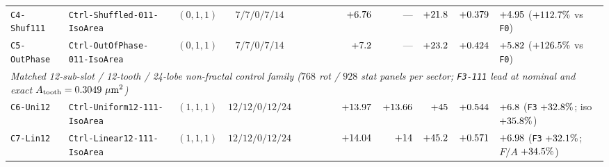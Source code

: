 \begin{table}[!htbp]
{\begin{tabular}{llccrrrrrrrrl}
\texttt{C4-Shuf111} & \texttt{Ctrl-Shuffled-011-IsoArea} & $(0,1,1)$ & $7 / 7 / 0 / 7 / 14$ & \roundfour{\NthreeUnithreedCtrlShuffledoneoneoneAreaUmtwo} & \roundtwo{\NthreeUnithreedCtrlShuffledoneoneonePedgeUm} & \roundtwo{\NthreeUnithreedCtrlShuffledoneoneoneAswUmtwo} & \roundone{\NthreeUnithreedCtrlShuffledoneoneoneGrHarmNm} & $+\roundtwo{\NthreeUnithreedCtrlShuffledoneoneoneFzPn}$ & --- & $+\roundone{\NthreeUnithreedCtrlShuffledoneoneoneFa}$ & $+\roundthree{\NthreeUnithreedCtrlShuffledoneoneoneFp}$ & $+\roundtwo{\NthreeUnithreedCtrlShuffledoneoneoneFasw}$ ($+\fpeval{round(100*(\NthreeUnithreedCtrlShuffledoneoneoneFzPn-\NthreeUnithreedFzerozerozeroFzPn)/\NthreeUnithreedFzerozerozeroFzPn,1)}\%$ vs \texttt{F0}) \\
\texttt{C5-OutPhase} & \texttt{Ctrl-OutOfPhase-011-IsoArea} & $(0,1,1)$ & $7 / 7 / 0 / 7 / 14$ & \roundfour{\NthreeUnithreedCtrlOutphaseAreaUmtwo} & \roundtwo{\NthreeUnithreedCtrlOutphasePedgeUm} & \roundtwo{\NthreeUnithreedCtrlOutphaseAswUmtwo} & \roundone{\NthreeUnithreedCtrlOutphaseGrHarmNm} & $+\roundtwo{\NthreeUnithreedCtrlOutphaseFzPn}$ & --- & $+\roundone{\NthreeUnithreedCtrlOutphaseFa}$ & $+\roundthree{\NthreeUnithreedCtrlOutphaseFp}$ & $+\roundtwo{\NthreeUnithreedCtrlOutphaseFasw}$ ($+\fpeval{round(100*(\NthreeUnithreedCtrlOutphaseFzPn-\NthreeUnithreedFzerozerozeroFzPn)/\NthreeUnithreedFzerozerozeroFzPn,1)}\%$ vs \texttt{F0}) \\
\midrule
\multicolumn{13}{l}{\emph{Matched 12-sub-slot / 12-tooth / 24-lobe non-fractal control family ($768$ rot / $928$ stat panels per sector; \texttt{F3-111} lead at nominal and exact $A_{\rm tooth}=0.3049\ \mu\text{m}^2$)}} \\
\texttt{C6-Uni12} & \texttt{Ctrl-Uniform12-111-IsoArea} & $(1,1,1)$ & $12 / 12 / 0 / 12 / 24$ & \roundfour{\NthreeUnithreedCtrlUnionetwoAreaUmtwo} & \roundtwo{\NthreeUnithreedCtrlUnionetwoPedgeUm} & \roundtwo{\NthreeUnithreedCtrlUnionetwoAswUmtwo} & \roundone{\NthreeUnithreedCtrlUnionetwoGrHarmNm} & $+\roundtwo{\NthreeUnithreedCtrlUnionetwoFzPn}$ & $+\roundtwo{\NthreeIsothreezerofournineCtrlUnionetwoFzPn}$ & $+\roundone{\NthreeUnithreedCtrlUnionetwoFa}$ & $+\roundthree{\NthreeUnithreedCtrlUnionetwoFp}$ & $+\roundtwo{\NthreeUnithreedCtrlUnionetwoFasw}$ (\texttt{F3} $+\roundone{\NthreeUnithreedGainFoneoneoneVsUnionetwoPct}\%$; iso $+\roundone{\NthreeIsothreezerofournineGainFoneoneoneVsUnionetwoPct}\%$) \\
\texttt{C7-Lin12} & \texttt{Ctrl-Linear12-111-IsoArea} & $(1,1,1)$ & $12 / 12 / 0 / 12 / 24$ & \roundfour{\NthreeUnithreedCtrlLinonetwoAreaUmtwo} & \roundtwo{\NthreeUnithreedCtrlLinonetwoPedgeUm} & \roundtwo{\NthreeUnithreedCtrlLinonetwoAswUmtwo} & \roundone{\NthreeUnithreedCtrlLinonetwoGrHarmNm} & $+\roundtwo{\NthreeUnithreedCtrlLinonetwoFzPn}$ & $+\roundtwo{\NthreeIsothreezerofournineCtrlLinonetwoFzPn}$ & $+\roundone{\NthreeUnithreedCtrlLinonetwoFa}$ & $+\roundthree{\NthreeUnithreedCtrlLinonetwoFp}$ & $+\roundtwo{\NthreeUnithreedCtrlLinonetwoFasw}$ (\texttt{F3} $+\roundone{\NthreeUnithreedGainFoneoneoneVsLinonetwoPct}\%$; $F/A$ $+\roundone{\NthreeUnithreedGainFoneoneoneVsLinonetwoFaPct}\%$) \\

\end{tabular}}
\end{table}
